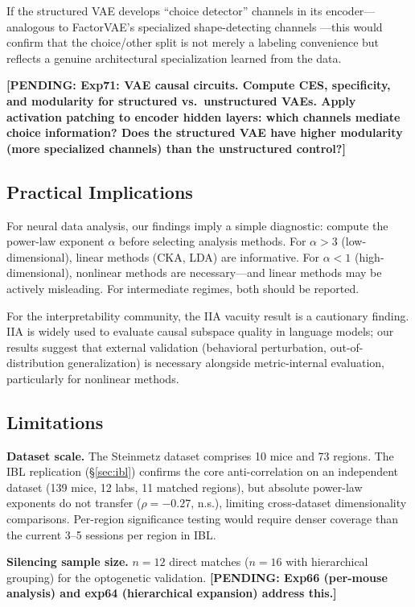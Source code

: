 \documentclass{article}
\newcommand{\pending}[1]{\textcolor{red!70!black}{\textbf{[PENDING: #1]}}}
\begin{document}
If the structured VAE develops ``choice detector'' channels in its encoder---analogous to FactorVAE's specialized shape-detecting channels \citep{martinez2025vae_circuits}---this would confirm that the choice/other split is not merely a labeling convenience but reflects a genuine architectural specialization learned from the data.

\pending{Exp71: VAE causal circuits. Compute CES, specificity, and modularity for structured vs.\ unstructured VAEs. Apply activation patching to encoder hidden layers: which channels mediate choice information? Does the structured VAE have higher modularity (more specialized channels) than the unstructured control?}

\subsection{Practical Implications}

For neural data analysis, our findings imply a simple diagnostic: compute the power-law exponent $\alpha$ before selecting analysis methods. For $\alpha > 3$ (low-dimensional), linear methods (CKA, LDA) are informative. For $\alpha < 1$ (high-dimensional), nonlinear methods are necessary---and linear methods may be actively misleading. For intermediate regimes, both should be reported.

For the interpretability community, the IIA vacuity result is a cautionary finding. IIA is widely used to evaluate causal subspace quality in language models; our results suggest that external validation (behavioral perturbation, out-of-distribution generalization) is necessary alongside metric-internal evaluation, particularly for nonlinear methods.

\subsection{Limitations}

\textbf{Dataset scale.} The Steinmetz dataset comprises 10 mice and 73 regions. The IBL replication (\S\ref{sec:ibl}) confirms the core anti-correlation on an independent dataset (139 mice, 12 labs, 11 matched regions), but absolute power-law exponents do not transfer ($\rho = -0.27$, n.s.), limiting cross-dataset dimensionality comparisons. Per-region significance testing would require denser coverage than the current 3--5 sessions per region in IBL.

\textbf{Silencing sample size.} $n = 12$ direct matches ($n = 16$ with hierarchical grouping) for the optogenetic validation. \pending{Exp66 (per-mouse analysis) and exp64 (hierarchical expansion) address this.}
\end{document}
